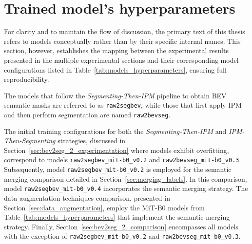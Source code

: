 \section{Trained model's hyperparameters} \label{appendix:models_hyperparameters}
For clarity and to maintain the flow of discussion, the primary text of this thesis refers to models conceptually rather than by their specific internal names. This section, however, establishes the mapping between the experimental results presented in the multiple experimental sections and their corresponding model configurations listed in Table~\ref{tab:models_hyperparameters}, ensuring full reproducibility.

The models that follow the \textit{Segmenting-Then-IPM} pipeline to obtain BEV semantic masks are referred to as \texttt{raw2segbev}, while those that first apply IPM and then perform segmentation are named \texttt{raw2bevseg}.

The initial training configurations for both the \textit{Segmenting-Then-IPM} and \textit{IPM-Then-Segmenting} strategies, discussed in Section~\ref{sec:bev2seg_2_experimentation} where models exhibit overfitting, correspond to models \texttt{raw2segbev\_mit-b0\_v0.2} and \texttt{raw2bevseg\_mit-b0\_v0.3}. Subsequently, model \texttt{raw2segbev\_mit-b0\_v0.2} is employed for the semantic merging comparison detailed in Section~\ref{sec:merging_labels}. In this comparison, model \texttt{raw2segbev\_mit-b0\_v0.4} incorporates the semantic merging strategy. The data augmentation techniques comparison, presented in Section~\ref{sec:data_augmentation}, employ the MiT-B0 models from Table~\ref{tab:models_hyperparameters} that implement the semantic merging strategy. Finally, Section~\ref{sec:bev2seg_2_comparison} encompasses all models with the exception of \texttt{raw2segbev\_mit-b0\_v0.2} and \texttt{raw2bevseg\_mit-b0\_v0.3}.

